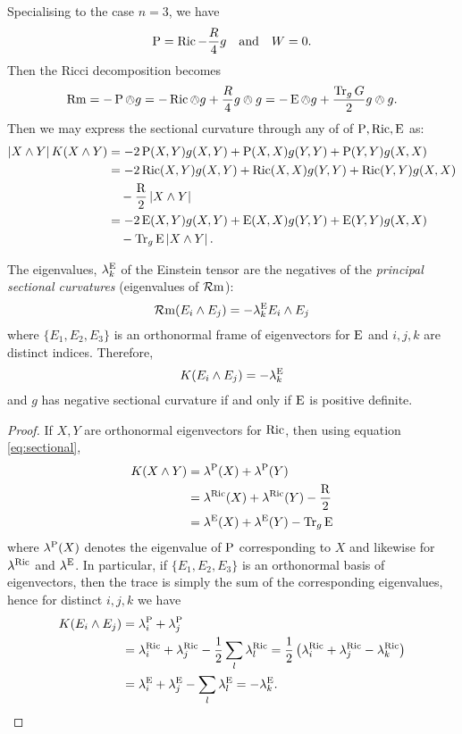 \documentclass[a4paper, 12pt]{amsart}
\begin{document}
Specialising to the case \(n = 3\), we have
\[
\operatorname{P} = \operatorname{Ric} - \frac{R}{4} g \quad \text{and} \quad W = 0.
\]
Then the Ricci decomposition becomes
\[
\operatorname{Rm} = -\operatorname{P} \owedge g = -\operatorname{Ric} \owedge g + \frac{R}{4} g \owedge g = -\operatorname{E} \owedge g + \frac{\operatorname{Tr}_g G}{2} g \owedge g.
\]
Then we may express the sectional curvature through any of of \(\operatorname{P}, \operatorname{Ric}, \operatorname{E}\) as:
\begin{equation}
\label{eq:sectional}
\begin{split}
\left\lvert{X \wedge Y}\right\rvert K(X \wedge Y) &= -2\operatorname{P}(X, Y) g(X, Y) + \operatorname{P}(X, X) g(Y, Y) + \operatorname{P}(Y, Y) g(X, X) \\
&= -2\operatorname{Ric}(X, Y) g(X, Y) + \operatorname{Ric}(X, X) g(Y, Y) + \operatorname{Ric}(Y, Y) g(X, X) \\
&\quad - \frac{\operatorname{R}}{2} \left\lvert{X \wedge Y}\right\rvert \\
&= -2\operatorname{E}(X, Y) g(X, Y) + \operatorname{E}(X, X) g(Y, Y) + \operatorname{E}(Y, Y) g(X, X) \\
&\quad - \operatorname{Tr}_g \operatorname{E} \left\lvert{X \wedge Y}\right\rvert.
\end{split}
\end{equation}

\begin{lemma}
\label{lem:eins_sectional}

The eigenvalues, \(\lambda^{\operatorname{E}}_k\) of the Einstein tensor are the negatives of the \emph{principal sectional curvatures} (eigenvalues of \(\operatorname{\mathcal{R}m}\)):
\[
\operatorname{\mathcal{R}m}(E_i \wedge E_j) = -\lambda^{\operatorname{E}}_k E_i \wedge E_j
\]
where \(\{E_1, E_2, E_3\}\) is an orthonormal frame of eigenvectors for \(\operatorname{E}\) and \(i,j,k\) are distinct indices. Therefore,
\[
K(E_i \wedge E_j) = -\lambda^{\operatorname{E}}_k
\]
and \(g\) has negative sectional curvature if and only if \(\operatorname{E}\) is positive definite.
\end{lemma}

\begin{proof}
If \(X, Y\) are orthonormal eigenvectors for \(\operatorname{Ric}\), then using equation \eqref{eq:sectional},
\begin{align*}
K(X \wedge Y) &= \lambda^{\operatorname{P}}(X) + \lambda^{\operatorname{P}}(Y) \\
&= \lambda^{\operatorname{Ric}} (X) + \lambda^{\operatorname{Ric}} (Y) - \frac{\operatorname{R}}{2} \\
&= \lambda^{\operatorname{E}} (X) + \lambda^{\operatorname{E}} (Y) - \operatorname{Tr}_g \operatorname{E} \\
\end{align*}
where \(\lambda^{\operatorname{P}}(X)\) denotes the eigenvalue of \(\operatorname{P}\) corresponding to \(X\) and likewise for \(\lambda^{\operatorname{Ric}}\) and \(\lambda^{\operatorname{E}}\). In particular, if \(\{E_1, E_2, E_3\}\) is an orthonormal basis of eigenvectors, then the trace is simply the sum of the corresponding eigenvalues, hence for distinct \(i,j,k\) we have
\begin{align*}
K(E_i \wedge E_j) &= \lambda^{\operatorname{P}}_i + \lambda^{\operatorname{P}}_j \\
&= \lambda^{\operatorname{Ric}}_i  + \lambda^{\operatorname{Ric}}_j - \frac{1}{2} \sum_l \lambda^{\operatorname{Ric}}_l = \frac{1}{2}\left(\lambda^{\operatorname{Ric}}_i + \lambda^{\operatorname{Ric}}_j -\lambda^{\operatorname{Ric}}_k\right) \\
&= \lambda^{\operatorname{E}}_i + \lambda^{\operatorname{E}}_j - \sum_l \lambda^{\operatorname{E}}_l = -\lambda^{\operatorname{E}}_k.
\end{align*}
\end{proof}
\end{document}
